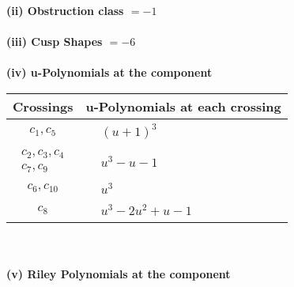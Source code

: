 \documentclass[1p]{elsarticle_modified}
\theoremstyle{definition}
\begin{document}
\flushleft \textbf{(ii) Obstruction class $= -1$}\\~\\
\flushleft \textbf{(iii) Cusp Shapes $= -6$}\\~\\
\newpage\renewcommand{\arraystretch}{1}
\flushleft \textbf{(iv) u-Polynomials at the component}\newline \\
\begin{tabular}{m{50pt}|m{274pt}}
Crossings & \hspace{64pt}u-Polynomials at each crossing \\
\hline $$\begin{aligned}c_{1},c_{5}\end{aligned}$$&$\begin{aligned}
&(u+1)^3
\end{aligned}$\\
\hline $$\begin{aligned}c_{2},c_{3},c_{4}\\c_{7},c_{9}\end{aligned}$$&$\begin{aligned}
&u^3- u-1
\end{aligned}$\\
\hline $$\begin{aligned}c_{6},c_{10}\end{aligned}$$&$\begin{aligned}
&u^3
\end{aligned}$\\
\hline $$\begin{aligned}c_{8}\end{aligned}$$&$\begin{aligned}
&u^3-2 u^2+u-1
\end{aligned}$\\
\hline
\end{tabular}\\~\\
\newpage\renewcommand{\arraystretch}{1}
\flushleft \textbf{(v) Riley Polynomials at the component}\newline \\
\end{document}
